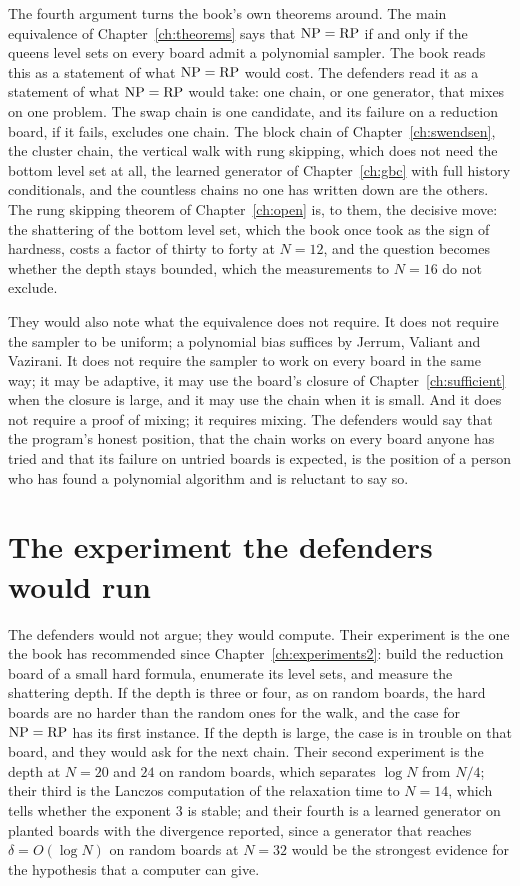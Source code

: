 The fourth argument turns the book's own theorems around. The main equivalence of Chapter~\ref{ch:theorems} says that $\mathrm{NP} = \mathrm{RP}$ if and only if the queens level sets on every board admit a polynomial sampler. The book reads this as a statement of what $\mathrm{NP} = \mathrm{RP}$ would cost. The defenders read it as a statement of what $\mathrm{NP} = \mathrm{RP}$ would take: one chain, or one generator, that mixes on one problem. The swap chain is one candidate, and its failure on a reduction board, if it fails, excludes one chain. The block chain of Chapter~\ref{ch:swendsen}, the cluster chain, the vertical walk with rung skipping, which does not need the bottom level set at all, the learned generator of Chapter~\ref{ch:gbc} with full history conditionals, and the countless chains no one has written down are the others. The rung skipping theorem of Chapter~\ref{ch:open} is, to them, the decisive move: the shattering of the bottom level set, which the book once took as the sign of hardness, costs a factor of thirty to forty at $N = 12$, and the question becomes whether the depth stays bounded, which the measurements to $N = 16$ do not exclude.

They would also note what the equivalence does not require. It does not require the sampler to be uniform; a polynomial bias suffices by Jerrum, Valiant and Vazirani. It does not require the sampler to work on every board in the same way; it may be adaptive, it may use the board's closure of Chapter~\ref{ch:sufficient} when the closure is large, and it may use the chain when it is small. And it does not require a proof of mixing; it requires mixing. The defenders would say that the program's honest position, that the chain works on every board anyone has tried and that its failure on untried boards is expected, is the position of a person who has found a polynomial algorithm and is reluctant to say so.

\section{The experiment the defenders would run}

The defenders would not argue; they would compute. Their experiment is the one the book has recommended since Chapter~\ref{ch:experiments2}: build the reduction board of a small hard formula, enumerate its level sets, and measure the shattering depth. If the depth is three or four, as on random boards, the hard boards are no harder than the random ones for the walk, and the case for $\mathrm{NP} = \mathrm{RP}$ has its first instance. If the depth is large, the case is in trouble on that board, and they would ask for the next chain. Their second experiment is the depth at $N = 20$ and $24$ on random boards, which separates $\log N$ from $N / 4$; their third is the Lanczos computation of the relaxation time to $N = 14$, which tells whether the exponent $3$ is stable; and their fourth is a learned generator on planted boards with the divergence reported, since a generator that reaches $\delta = O(\log N)$ on random boards at $N = 32$ would be the strongest evidence for the hypothesis that a computer can give.


